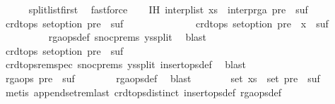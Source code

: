 \begin{isabellebody}
\ \ \ \ \isamarkupfalse%
\ split{\isacharunderscore}list{\isacharunderscore}first\ \isamarkupfalse%
\ fastforce\isanewline
\ \ \isamarkupfalse%
\ IH{\isacharcolon}\ {\isachardoublequoteopen}interp{\isacharunderscore}list\ xs\ {\isacharequal}\ interp{\isacharunderscore}rga\ {\isacharparenleft}pre\ {\isacharat}\ suf{\isacharparenright}{\isachardoublequoteclose}\isanewline
\ \ \isamarkupfalse%
\ {\isacharminus}\isanewline
\ \ \ \ \isamarkupfalse%
\ {\isachardoublequoteopen}crdt{\isacharunderscore}ops\ set{\isacharunderscore}option\ {\isacharparenleft}pre\ {\isacharat}\ suf{\isacharparenright}{\isachardoublequoteclose}\isanewline
\ \ \ \ \isamarkupfalse%
\ {\isacharminus}\isanewline
\ \ \ \ \ \ \isamarkupfalse%
\ {\isachardoublequoteopen}crdt{\isacharunderscore}ops\ set{\isacharunderscore}option\ {\isacharparenleft}pre\ {\isacharat}\ {\isacharbrackleft}x{\isacharbrackright}\ {\isacharat}\ suf{\isacharparenright}{\isachardoublequoteclose}\isanewline
\ \ \ \ \ \ \ \ \isamarkupfalse%
\ rga{\isacharunderscore}ops{\isacharunderscore}def\ snoc{\isachardot}prems{\isacharparenleft}{}{\isacharparenright}\ ys{\isacharunderscore}split\ \isamarkupfalse%
\ blast\isanewline
\ \ \ \ \ \ \isamarkupfalse%
\ {\isachardoublequoteopen}crdt{\isacharunderscore}ops\ set{\isacharunderscore}option\ {\isacharparenleft}pre\ {\isacharat}\ suf{\isacharparenright}{\isachardoublequoteclose}\isanewline
\ \ \ \ \ \ \ \ \isamarkupfalse%
\ crdt{\isacharunderscore}ops{\isacharunderscore}rem{\isacharunderscore}spec\ snoc{\isachardot}prems\ ys{\isacharunderscore}split\ insert{\isacharunderscore}ops{\isacharunderscore}def\ \isamarkupfalse%
\ blast\isanewline
\ \ \ \ \isamarkupfalse%
\isanewline
\ \ \ \ \isamarkupfalse%
\ {\isachardoublequoteopen}rga{\isacharunderscore}ops\ {\isacharparenleft}pre\ {\isacharat}\ suf{\isacharparenright}{\isachardoublequoteclose}\isanewline
\ \ \ \ \ \ \isamarkupfalse%
\ rga{\isacharunderscore}ops{\isacharunderscore}def\ \isamarkupfalse%
\ blast\isanewline
\ \ \ \ \isamarkupfalse%
\ \isamarkupfalse%
\ {\isachardoublequoteopen}set\ xs\ {\isacharequal}\ set\ {\isacharparenleft}pre\ {\isacharat}\ suf{\isacharparenright}{\isachardoublequoteclose}\isanewline
\ \ \ \ \ \ \isamarkupfalse%
\ {\isacharparenleft}metis\ append{\isacharunderscore}set{\isacharunderscore}rem{\isacharunderscore}last\ crdt{\isacharunderscore}ops{\isacharunderscore}distinct\ insert{\isacharunderscore}ops{\isacharunderscore}def\ rga{\isacharunderscore}ops{\isacharunderscore}def\isanewline

\end{isabellebody}

